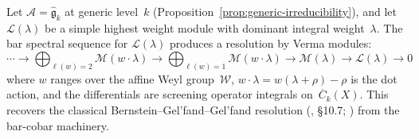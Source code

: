 \begin{theorem}
\label{thm:bgg-from-bar}
Let $\mathcal{A} = \widehat{\mathfrak{g}}_k$ at generic level~$k$
(Proposition~\ref{prop:generic-irreducibility}), and let
$\mathcal{L}(\lambda)$ be a simple highest weight module with
dominant integral weight~$\lambda$.  The bar spectral sequence for
$\mathcal{L}(\lambda)$ produces a resolution by Verma modules:
\begin{equation}\label{eq:bgg-from-bar}
\cdots \to \bigoplus_{\ell(w)=2} \mathcal{M}(w \cdot \lambda)
\to \bigoplus_{\ell(w)=1} \mathcal{M}(w \cdot \lambda)
\to \mathcal{M}(\lambda) \to \mathcal{L}(\lambda) \to 0
\end{equation}
where $w$ ranges over the affine Weyl
group~$\mathcal{W}$, $w \cdot \lambda = w(\lambda + \rho) - \rho$
is the dot action, and the differentials are screening operator
integrals on~$\overline{C}_k(X)$.  This recovers the classical
Bernstein--Gel'fand--Gel'fand resolution
\textup{(\cite{Kac}, \S10.7; \cite{BGG76})} from the bar-cobar
machinery.
\end{theorem}

